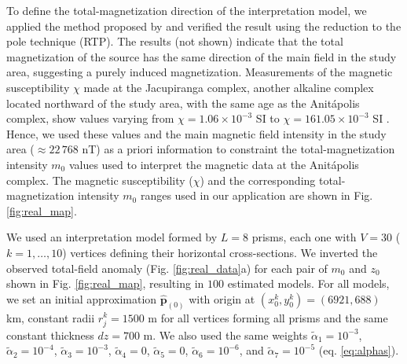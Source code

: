 To define the total-magnetization direction of the interpretation model, 
we applied the method proposed by \citet{oliveirajr-etal2015} and verified the 
result using the reduction to the pole technique (RTP). The results (not shown) 
indicate that the total magnetization of the source has the same direction of the 
main field in the study area, suggesting a purely induced magnetization.
Measurements of the magnetic susceptibility $\chi$ made at the Jacupiranga complex,
another alkaline complex located northward of the study area, 
with the same age as the Anit{\'a}polis complex, 
show values varying from $\chi = 1.06 \times 10^{-3}$ SI to 
$\chi = 161.05 \times 10^{-3}$ SI \citep[][ tb. 1]{valdivia-2009}.
Hence, we used these values and the main magnetic field intensity in the study area 
($\approx 22 \, 768 $ nT) as a priori information to constraint the 
total-magnetization intensity $m_{0}$ values used to interpret the magnetic data 
at the Anit{\'a}polis complex.
The magnetic susceptibility ($ \chi $) and the corresponding total-magnetization 
intensity $m_{0}$ ranges used in our application are shown in Fig. \ref{fig:real_map}.

We used an interpretation model formed by $L = 8$ prisms, each one with 
$V = 30$ ($k = 1, \dots , 10$) vertices defining their horizontal cross-sections.
We inverted the observed total-field anomaly (Fig. \ref{fig:real_data}a) for each 
pair of $m_0$ and $z_0$ shown in Fig. \ref{fig:real_map}, resulting in $100$ estimated 
models. 
For all models, we set an initial approximation $\hat{\mathbf{p}}_{(0)}$ with origin 
at $(x_0^k, y_0^k) = (6921, 688)$ km, constant radii $r_j^k = 1500$ m for 
all vertices forming all prisms and the same constant thickness $dz = 700$ m.
We also used the same weights $\tilde{\alpha}_1 = 10^{-3}$, 
$\tilde{\alpha}_2 = 10^{-4}$, 
$\tilde{\alpha}_3 = 10^{-3}$, $\tilde{\alpha}_4 = 0$, $\tilde{\alpha}_5 = 0$, 
$\tilde{\alpha}_6 = 10^{-6}$, and $\tilde{\alpha}_7 = 10^{-5}$ (eq. \ref{eq:alphas}). 

